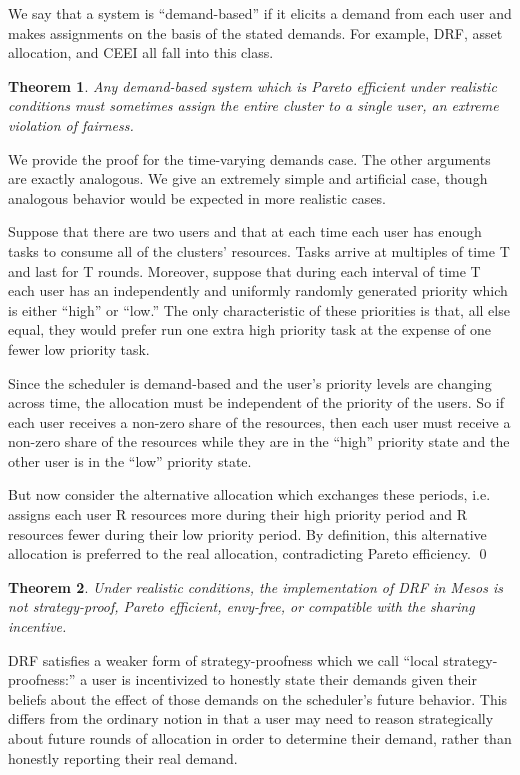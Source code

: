 \documentclass{acm_proc_article-sp}
\newtheorem{theorem}{Theorem}[section]
\newenvironment{pproof}[1][Proof]{\begin{trivlist}
\item[\hskip \labelsep {\bfseries #1}]}{\end{trivlist}}
\begin{document}
We say that a system is ``demand-based'' if it elicits a demand from each user and makes assignments on the basis of the stated demands. For example, DRF, asset allocation, and CEEI all fall into this class.
\vspace{-5mm}
\begin{theorem}\label{demand-bad}
Any demand-based system which is Pareto efficient under realistic conditions must sometimes assign the entire cluster to a single user, an extreme violation of fairness.
\end{theorem}
\vspace{-5mm}
\begin{pproof}
We provide the proof for the time-varying demands case. The other arguments are exactly analogous. We give an extremely simple and artificial case, though analogous behavior would be expected in more realistic cases.

Suppose that there are two users and that at each time each user has enough tasks to consume all of the clusters' resources. Tasks arrive at multiples of time T and last for T rounds. Moreover, suppose that during each interval of time T each user has an independently and uniformly randomly generated priority which is either ``high'' or ``low.'' The only characteristic of these priorities is that, all else equal, they would prefer run one extra high priority task at the expense of one fewer low priority task.

Since the scheduler is demand-based and the user's priority levels are changing across time, the allocation must be independent of the priority of the users. So if each user receives a non-zero share of the resources, then each user must receive a non-zero share of the resources while they are in the ``high'' priority state and the other user is in the ``low'' priority state. 

But now consider the alternative allocation which exchanges these periods, i.e. assigns each user R resources more during their high priority period and R resources fewer during their low priority period. By definition, this alternative allocation is preferred to the real allocation, contradicting Pareto efficiency.
\qed
\end{pproof}
\vspace{-5mm}
\begin{theorem}
Under realistic conditions, the implementation of DRF in Mesos is not strategy-proof, Pareto efficient, envy-free, or compatible with the sharing incentive. 
\end{theorem}
\vspace{-5mm}
DRF satisfies a weaker form of strategy-proofness which we call ``local strategy-proofness:'' 
a user is incentivized to honestly state their demands given their beliefs about the effect of those demands on the scheduler's future behavior. 
This differs from the ordinary notion in that a user may need to reason strategically about future rounds of allocation in order to determine
their demand, rather than honestly reporting their real demand.
\end{document}
